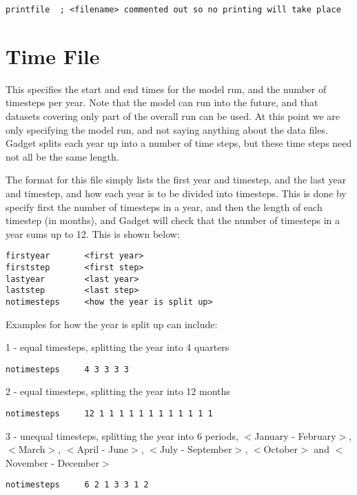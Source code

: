 \documentclass [a4paper, 10pt]{book}
\begin{document}
\begin{verbatim}
printfile  ; <filename> commented out so no printing will take place
\end{verbatim}

\section{Time File}\label{sec:timefile}
This specifies the start and end times for the model run, and the number of timesteps per year. Note that the model can run into the future, and that datasets covering only part of the overall run can be used.  At this point we are only specifying the model run, and not saying anything about the data files.  Gadget splits each year up into a number of time steps, but these time steps need not all be the same length.

\bigskip
The format for this file simply lists the first year and timestep, and the last year and timestep, and how each year is to be divided into timesteps.  This is done by specify first the number of timesteps in a year, and then the length of each timestep (in months), and Gadget will check that the number of timesteps in a year sums up to 12.  This is shown below:

\begin{verbatim}
firstyear       <first year>
firststep       <first step>
lastyear        <last year>
laststep        <last step>
notimesteps     <how the year is split up>
\end{verbatim}

Examples for how the year is split up can include:\newline

1 - equal timesteps, splitting the year into 4 quarters
\begin{verbatim}
notimesteps     4 3 3 3 3
\end{verbatim}

2 - equal timesteps, splitting the year into 12 months
\begin{verbatim}
notimesteps     12 1 1 1 1 1 1 1 1 1 1 1 1
\end{verbatim}

3 - unequal timesteps, splitting the year into 6 periods, $<$January - February$>$, $<$March$>$, $<$April - June$>$, $<$July - September$>$, $<$October$>$ and $<$November - December$>$
\begin{verbatim}
notimesteps     6 2 1 3 3 1 2
\end{verbatim}
\end{document}
